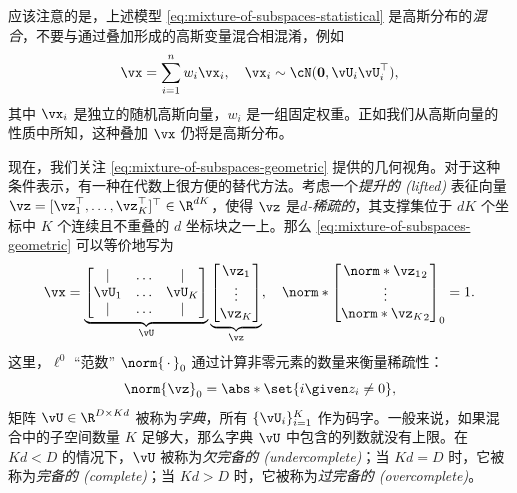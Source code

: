 \documentclass[../../book-main_zh.tex]{subfiles}
\begin{document}
\begin{remark}[高斯混合与高斯叠加]
    应该注意的是，上述模型 \eqref{eq:mixture-of-subspaces-statistical}
    是高斯分布的\textit{混合}，不要与通过叠加形成的高斯变量混合相混淆，例如
    \begin{equation}
        \vx = \sum_{i=1}^n w_i \vx_i, \quad \vx_i \sim
        \cN(\mathbf{0}, \vU_i\vU_i^\top),
    \end{equation}
    其中 $\vx_i$ 是独立的随机高斯向量，$w_i$ 是一组固定权重。正如我们从高斯向量的性质中所知，这种叠加 $\vx$ 仍将是高斯分布。
\end{remark}

现在，我们关注 \eqref{eq:mixture-of-subspaces-geometric}
提供的几何视角。对于这种条件表示，有一种在代数上很方便的替代方法。考虑一个\textit{提升的 (lifted)} 表征向量 $\vz
= [\vz_1^\top, \dots, \vz_K^\top]^\top \in \R^{dK}$，使得 $\vz$
是\textit{$d$-稀疏的}，其支撑集位于 $dK$ 个坐标中 $K$ 个连续且不重叠的 $d$ 坐标块之一上。那么
\eqref{eq:mixture-of-subspaces-geometric} 可以等价地写为
\begin{equation}\label{eq:mixture-of-subspaces-dictionary-pre}
    \vx =
    \underbrace{
        \begin{bmatrix}
            | & \dots & |  \\
            \vU_1 & \dots & \vU_K  \\
            | & \dots & |
        \end{bmatrix}
    }_{\vU}
    \underbrace{
        \begin{bmatrix} \vz_1 \\ \vdots \\ \vz_K
        \end{bmatrix}
    }_{\vz},
    \quad
    \norm*{
        \begin{bmatrix} \norm*{\vz_1}_2 \\ \vdots \\ \norm*{\vz_K}_2
        \end{bmatrix}
    }_0 = 1.
\end{equation}
这里，$\ell^0$ “范数” $\norm{\,\cdot\,}_0$ 通过计算非零元素的数量来衡量稀疏性：
\begin{equation}\label{eq:ell-zero-norm}
    \norm{\vz}_0 = \abs*{\set{i \given z_i \neq 0}},
\end{equation}
矩阵 $\vU \in \R^{D \times Kd}$ 被称为\textit{字典}，所有 $\{\vU_i\}_{i=1}^K$
作为码字。一般来说，如果混合中的子空间数量 $K$ 足够大，那么字典 $\vU$ 中包含的列数就没有上限。在 $Kd < D$
的情况下，$\vU$ 被称为\textit{欠完备的 (undercomplete)}；当 $Kd = D$
时，它被称为\textit{完备的 (complete)}；当 $Kd > D$ 时，它被称为\textit{过完备的 (overcomplete)}。
\end{document}
